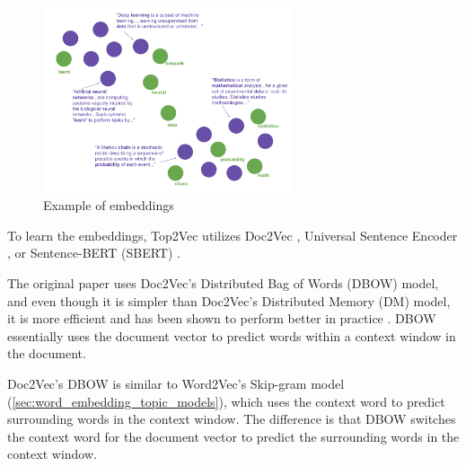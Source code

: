 \begin{figure}[h] %
    \centering
    \includegraphics[width=0.65\textwidth]{figures/doc_word_embedding.pdf}
    \caption{Example of embeddings}
    \label{fig:doc_word_embedding}
\end{figure}

To learn the embeddings, Top2Vec utilizes Doc2Vec \cite{le_distributed_2014, rehurek_software_2010}, Universal Sentence Encoder \cite{cer_universal_2018}, or Sentence-BERT (SBERT) \cite{reimers_sentence-bert_2019}.

The original paper uses Doc2Vec's Distributed Bag of Words (DBOW) model, and even though it is simpler than Doc2Vec's Distributed Memory (DM) model, it is more efficient and has been shown to perform better in practice \cite{lau_empirical_2016}. DBOW essentially uses the document vector to predict words within a context window in the document.

Doc2Vec's DBOW is similar to Word2Vec's Skip-gram model (\cref{sec:word_embedding_topic_models}), which uses the context word to predict surrounding words in the context window. The difference is that DBOW switches the context word for the document vector to predict the surrounding words in the context window.

